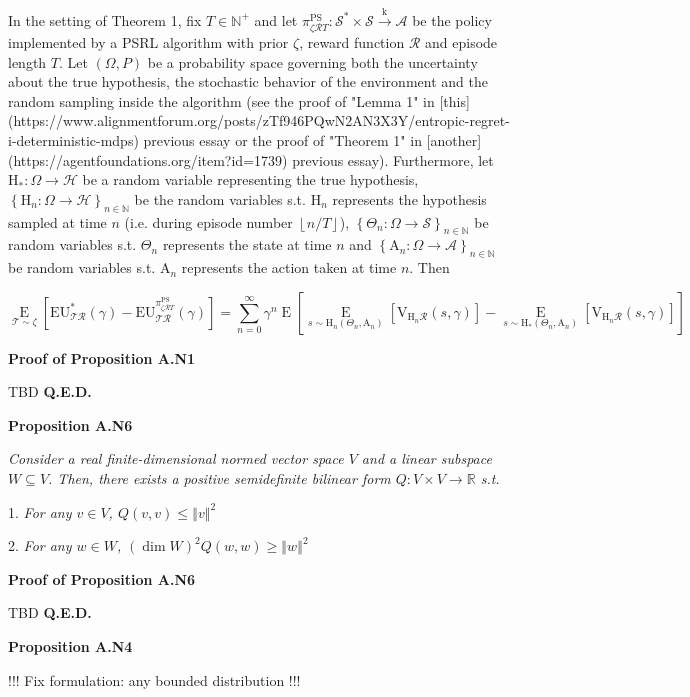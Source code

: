 \documentclass[a4paper]{article}
\newcommand{\Co}[1]{}
\newcommand{\AP}[1]{\left(#1\right)}
\newcommand{\AB}[1]{\left[#1\right]}
\newcommand{\AC}[1]{\left\{#1\right\}}
\newcommand{\Ea}[2]{\underset{#1}{\operatorname{E}}\AB{#2}}
\newcommand{\Nats}{\mathbb{N}}
\newcommand{\Reals}{\mathbb{R}}
\newcommand{\Norm}[1]{\left\Vert #1 \right\Vert}
\newcommand{\Floor}[1]{\left\lfloor #1 \right\rfloor}
\newcommand{\K}{\xrightarrow{\mathrm{k}}}
\newcommand{\St}{\mathcal{S}}
\newcommand{\A}{\mathcal{A}}
\newcommand{\R}{\mathcal{R}}
\newcommand{\T}{\mathcal{T}}
\newcommand{\Hy}{\mathcal{H}}
\newcommand{\V}{\mathrm{V}}
\newcommand{\EU}{\mathrm{EU}}
\newcommand{\PSR}{\text{PS}}
\newcommand{\AT}{\mathrm{A}}
\newcommand{\THy}{\mathrm{H}_*}
\newcommand{\SHy}{\mathrm{H}}
\begin{document}
In the setting of Theorem 1, fix $T\in\Nats^+$ and let $\pi_{\zeta\R T}^{\PSR}: \St^*\times\St\K\A$ be the policy implemented by a PSRL algorithm with prior $\zeta$, reward function $\R$ and episode length $T$. Let $(\Omega,P)$ be a probability space governing both the uncertainty about the true hypothesis, the stochastic behavior of the environment and the random sampling inside the algorithm (see the proof of "Lemma 1" in [this](https://www.alignmentforum.org/posts/zTf946PQwN2AN3X3Y/entropic-regret-i-deterministic-mdps) previous essay or the proof of "Theorem 1" in [another](https://agentfoundations.org/item?id=1739) previous essay). Furthermore, let $\THy:\Omega\rightarrow\Hy$ be a random variable representing the true hypothesis, $\AC{\SHy_n:\Omega\rightarrow\Hy}_{n\in\Nats}$ be the random variables s.t. $\SHy_n$ represents the hypothesis sampled at time $n$ (i.e. during episode number $\Floor{n/T}$), $\AC{\Theta_n:\Omega\rightarrow\St}_{n\in\Nats}$ be random variables s.t. $\Theta_n$ represents the state at time $n$ and $\AC{\AT_n:\Omega\rightarrow\A}_{n\in\Nats}$ be random variables s.t. $\AT_n$ represents the action taken at time $n$. Then

$$\Ea{\T\sim\zeta}{\EU^*_{\T\R}(\gamma)-\EU^{\pi_{\zeta\R T}^{\PSR}}_{\T\R}(\gamma)}=\sum_{n=0}^\infty\gamma^{n}\Ea{}{\Ea{s\sim \SHy_n\AP{\Theta_n,\AT_n}}{\V_{\SHy_n\R}(s,\gamma)}-\Ea{s\sim \THy\AP{\Theta_n,\AT_n}}{\V_{\SHy_n\R}(s,\gamma)}}$$

\textbf{Proof of Proposition A.N1}\Co{b}


TBD \textbf{Q.E.D.}\Co{b}

\textbf{Proposition A.N6}\Co{b}

\textit{Consider a real finite-dimensional normed vector space $V$ and a linear subspace $W\subseteq V$. Then, there exists a positive semidefinite bilinear form $Q: V \times V \rightarrow \Reals$ s.t.}\Co{i}

1. \textit{For any $v\in V$, $Q(v,v)\leq\Norm{v}^2$}\Co{i}

2. \textit{For any $w\in W$, $\AP{\dim{W}}^2 Q(w,w)\geq \Norm{w}^2$}\Co{i}

\textbf{Proof of Proposition A.N6}\Co{b}

TBD \textbf{Q.E.D.}\Co{b}

\textbf{Proposition A.N4}\Co{b}

!!! Fix formulation: any bounded distribution !!!
\end{document}
